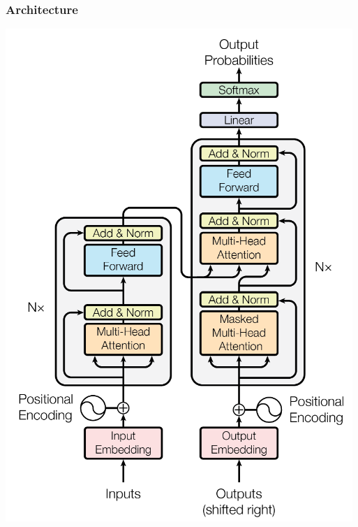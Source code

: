 \documentclass{beamer}
\begin{document}
\begin{frame}
    \frametitle{Architecture}
    \begin{center}
        \includegraphics[scale=1.15]{img/transformer.png}
    \end{center}
\end{frame}
\end{document}
